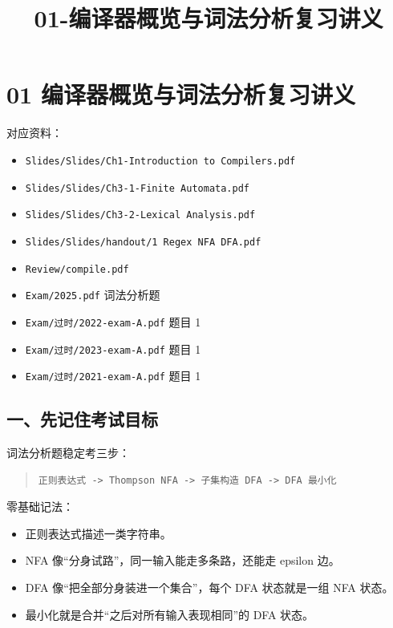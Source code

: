 \documentclass[UTF8,zihao=-4]{ctexart}
\title{01-编译器概览与词法分析复习讲义}
\author{}
\date{}
\begin{document}
\maketitle
\setcounter{tocdepth}{1}
\tableofcontents
\newpage
\section{01 编译器概览与词法分析复习讲义}


对应资料：


\begin{itemize}
\item \texttt{Slides/Slides/Ch1-Introduction to Compilers.pdf}
\item \texttt{Slides/Slides/Ch3-1-Finite Automata.pdf}
\item \texttt{Slides/Slides/Ch3-2-Lexical Analysis.pdf}
\item \texttt{Slides/Slides/handout/1 Regex NFA DFA.pdf}
\item \texttt{Review/compile.pdf}
\item \texttt{Exam/2025.pdf} 词法分析题
\item \texttt{Exam/过时/2022-exam-A.pdf} 题目 1
\item \texttt{Exam/过时/2023-exam-A.pdf} 题目 1
\item \texttt{Exam/过时/2021-exam-A.pdf} 题目 1
\end{itemize}


\subsection{一、先记住考试目标}


词法分析题稳定考三步：


\begin{quote}
\footnotesize
\begin{verbatim}
正则表达式 -> Thompson NFA -> 子集构造 DFA -> DFA 最小化
\end{verbatim}
\end{quote}


零基础记法：


\begin{itemize}
\item 正则表达式描述一类字符串。
\item NFA 像“分身试路”，同一输入能走多条路，还能走 epsilon 边。
\item DFA 像“把全部分身装进一个集合”，每个 DFA 状态就是一组 NFA 状态。
\item 最小化就是合并“之后对所有输入表现相同”的 DFA 状态。
\end{itemize}
\end{document}
